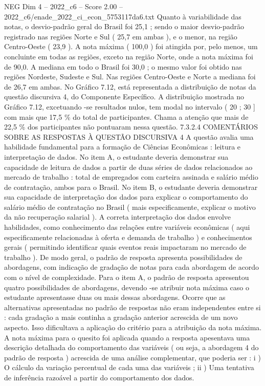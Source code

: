 \begin{textsample}{NEG Dim 4 – 2022\_c6 – Score 2.00 – 2022\_c6/enade\_2022\_ci\_econ\_5753117da6.txt}
Quanto à variabilidade das notas, o desvio-padrão geral do Brasil foi 25,1 ; sendo o maior desvio-padrão registrado nas regiões Norte e Sul ( 25,7 em ambas ), e o menor, na região Centro-Oeste ( 23,9 ).
A nota máxima ( 100,0 ) foi atingida por, pelo menos, um concluinte em todas as regiões, exceto na região Norte, onde a nota máxima foi de 90,0.
A mediana em todo o Brasil foi 30,0 ; o mesmo valor foi obtido nas regiões Nordeste, Sudeste e Sul.
Nas regiões Centro-Oeste e Norte a mediana foi de 26,7 em ambas.
No Gráfico 7.12, está representada a distribuição de notas da questão discursiva 4, do Componente Específico.
A distribuição mostrada no Gráfico 7.12, excetuando -se resultados nulos, tem modal no intervalo ( 20 ; 30 ] com mais que 17,5 \% do total de participantes.
Chama a atenção que mais de 22,5 \% dos participantes não pontuaram nessa questão. 7.3.2.4 COMENTÁRIOS SOBRE AS RESPOSTAS À QUESTÃO DISCURSIVA 4 A questão avalia uma habilidade fundamental para a formação de Ciências Econômicas : leitura e interpretação de dados.
No item A, o estudante deveria demonstrar sua capacidade de leitura de dados a partir de duas séries de dados relacionados ao mercado de trabalho : total de empregados com carteira assinada e salário médio de contratação, ambos para o Brasil.
No item B, o estudante deveria demonstrar sua capacidade de interpretação dos dados para explicar o comportamento do salário médio de contratação no Brasil ( mais especificamente, explicar o motivo da não recuperação salarial ).
A correta interpretação dos dados envolve habilidades, como conhecimento das relações entre variáveis econômicas ( aqui especificamente relacionadas à oferta e demanda de trabalho ) e conhecimentos gerais ( permitindo identificar quais eventos reais impactaram no mercado de trabalho ).
De modo geral, o padrão de resposta apresenta possibilidades de abordagens, com indicação de gradação de notas para cada abordagem de acordo com o nível de complexidade.
Para o item A, o padrão de resposta apresentou quatro possibilidades de abordagens, devendo -se atribuir nota máxima caso o estudante apresentasse duas ou mais dessas abordagens.
Ocorre que as alternativas apresentadas no padrão de respostas não eram independentes entre si : cada gradação a mais continha a gradação anterior acrescida de um novo aspecto.
Isso dificultava a aplicação do critério para a atribuição da nota máxima.
A nota máxima para o quesito foi aplicada quando a resposta apesentava uma descrição detalhada do comportamento das variáveis ( ou seja, a abordagem 4 do padrão de resposta ) acrescida de uma análise complementar, que poderia ser : i ) O cálculo da variação percentual de cada uma das variáveis ; ii ) Uma tentativa de inferência razoável a partir do comportamento dos dados.

\end{textsample}
